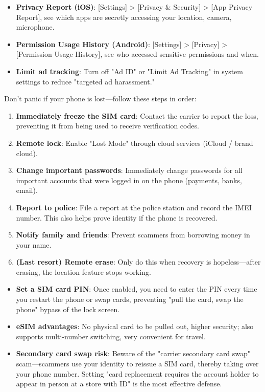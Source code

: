 
\begin{itemize}
  \item \textbf{Privacy Report (iOS)}: [Settings] > [Privacy \& Security] > [App Privacy Report], see which apps are secretly accessing your location, camera, microphone.
  \item \textbf{Permission Usage History (Android)}: [Settings] > [Privacy] > [Permission Usage History], see who accessed sensitive permissions and when.
  \item \textbf{Limit ad tracking}: Turn off "Ad ID" or "Limit Ad Tracking" in system settings to reduce "targeted ad harassment."
\end{itemize}


Don't panic if your phone is lost—follow these steps in order:

\begin{enumerate}
  \item \textbf{Immediately freeze the SIM card}: Contact the carrier to report the loss, preventing it from being used to receive verification codes.
  \item \textbf{Remote lock}: Enable "Lost Mode" through cloud services (iCloud / brand cloud).
  \item \textbf{Change important passwords}: Immediately change passwords for all important accounts that were logged in on the phone (payments, banks, email).
  \item \textbf{Report to police}: File a report at the police station and record the IMEI number. This also helps prove identity if the phone is recovered.
  \item \textbf{Notify family and friends}: Prevent scammers from borrowing money in your name.
  \item \textbf{(Last resort) Remote erase}: Only do this when recovery is hopeless—after erasing, the location feature stops working.
\end{enumerate}


\begin{itemize}
  \item \textbf{Set a SIM card PIN}: Once enabled, you need to enter the PIN every time you restart the phone or swap cards, preventing "pull the card, swap the phone" bypass of the lock screen.
  \item \textbf{eSIM advantages}: No physical card to be pulled out, higher security; also supports multi-number switching, very convenient for travel.
  \item \textbf{Secondary card swap risk}: Beware of the "carrier secondary card swap" scam—scammers use your identity to reissue a SIM card, thereby taking over your phone number. Setting "card replacement requires the account holder to appear in person at a store with ID" is the most effective defense.
\end{itemize}

